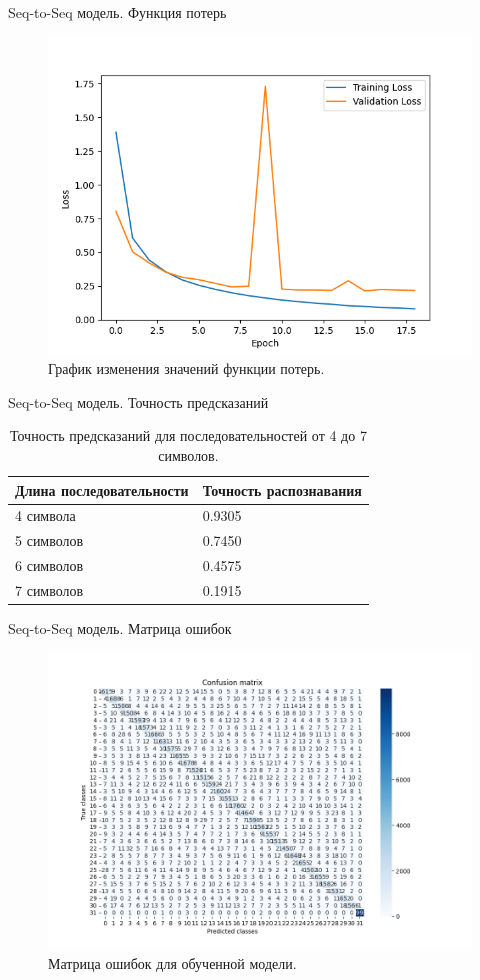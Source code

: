 \documentclass[12pt,a4paper,mathserif]{beamer}
\begin{document}
\begin{frame}{Seq-to-Seq модель. Функция потерь}
    \begin{figure}[H]
        \centering
        \includegraphics[width=0.7\linewidth]{imgs/Model_loss.png}
        \caption{График изменения значений функции потерь.}
        \label{fig:loss}
    \end{figure}
\end{frame}

\begin{frame}{Seq-to-Seq модель. Точность предсказаний}
    \begin{table}[H]
    \centering
    \caption{Точность предсказаний для последовательностей от 4 до 7 символов.}
    \begin{tabular}{|l|l|}
        \hline
        Длина последовательности & Точность распознавания \\
        \hline
        4 символа & 0.9305 \\
        \hline
        5 символов & 0.7450 \\
        \hline
        6 символов & 0.4575 \\
        \hline
        7 символов & 0.1915 \\
        \hline
    \end{tabular}
    \label{tab:probability}
\end{table}
\end{frame}

\begin{frame}{Seq-to-Seq модель. Матрица ошибок}
    \begin{figure}[H]
        \centering
        \includegraphics[width=0.85\linewidth]{imgs/Confusion_matrix.png}
        \caption{Матрица ошибок для обученной модели.}
        \label{fig:cm}
    \end{figure}
\end{frame}
\end{document}

